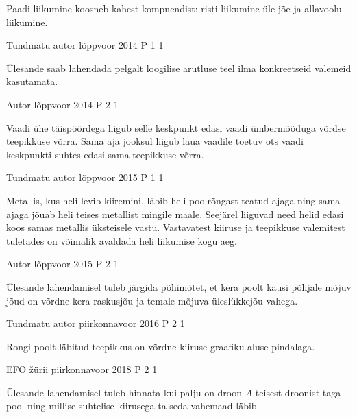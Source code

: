 \documentclass[11pt]{article}
\begin{document}
{{\ifHint
Paadi liikumine koosneb kahest kompnendist: risti liikumine üle jõe ja allavoolu liikumine.
\fi
}

{Tundmatu autor} %
{lõppvoor} %
{2014} %
{P 1} %
{1} %
{

\ifHint
Ülesande saab lahendada pelgalt loogilise arutluse teel ilma konkreetseid valemeid kasutamata.
\fi
}



{Autor} %
{lõppvoor} %
{2014} %
{P 2} %
{1} %
{

\ifHint
Vaadi ühe täispöördega liigub selle keskpunkt edasi vaadi ümbermõõduga võrdse teepikkuse võrra. Sama aja jooksul liigub laua vaadile toetuv ots vaadi keskpunkti suhtes edasi sama teepikkuse võrra. 
\fi
}


{Tundmatu autor} %
{lõppvoor} %
{2015} %
{P 1} %
{1} %
{

\ifHint
Metallis, kus heli levib kiiremini, läbib heli poolrõngast teatud ajaga ning sama ajaga jõuab heli teises metallist mingile maale. Seejärel liiguvad need helid edasi koos samas metallis üksteisele vastu. Vastavatest kiiruse ja teepikkuse valemitest tuletades on võimalik avaldada heli liikumise kogu aeg.
\fi
}

{Autor} %
{lõppvoor} %
{2015} %
{P 2} %
{1} %
{

\ifHint
Ülesande lahendamisel tuleb järgida põhimõtet, et kera poolt kausi põhjale mõjuv jõud on võrdne kera raskusjõu ja temale mõjuva üleslükkejõu vahega.
\fi
}

{Tundmatu autor} %
{piirkonnavoor} %
{2016} %
{P 2} %
{1} %
{

\ifHint
Rongi poolt läbitud teepikkus on võrdne kiiruse graafiku aluse pindalaga.
\fi
}

{EFO žürii} %
{piirkonnavoor} %
{2018} %
{P 2} %
{1} %
{

\ifHint
Ülesande lahendamisel tuleb hinnata kui palju on droon $A$ teisest droonist taga pool ning millise suhtelise kiirusega ta seda vahemaad läbib.
\fi
}


}
\end{document}
